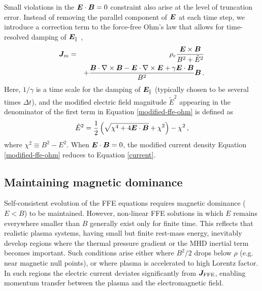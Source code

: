Small violations in the $\boldsymbol{E} \cdot\boldsymbol{B} = 0$ constraint also arise at the level of truncation error. Instead of removing the parallel component of $\boldsymbol{E}$ at each time step, we introduce a correction term to the force-free Ohm's law that allows for time-resolved damping of $\boldsymbol{E}_\parallel$ \citep{2017MNRAS.469.3656P},
%
\begin{eqnarray} \label{modified-ffe-ohm}
		\boldsymbol{J}_m &=& \rho_e \frac{\boldsymbol{E}\times\boldsymbol{B}}{B^2 +\tilde{E}^2} \nonumber\\
		 && + \frac{\boldsymbol{B}\cdot\nabla\times \boldsymbol{B} - \boldsymbol{E}\cdot\nabla\times\boldsymbol{E} + \gamma \boldsymbol{E}\cdot\boldsymbol{B}}{B^2}\boldsymbol{B} \, .
\end{eqnarray}
%
Here, $1 / \gamma$ is a time scale for the damping of $\boldsymbol{E}_\parallel$ (typically chosen to be several times $\Delta t$), and the modified electric field magnitude $\tilde E^2$ appearing in the denominator of the first term in Equation \ref{modified-ffe-ohm} is defined as \citep{2012ApJ...746...60L}
%
\begin{equation}
	\tilde{E}^2 = \frac{1}{2} \left(\sqrt{\chi^4 + 4 \boldsymbol{E} \cdot \boldsymbol{B}} + \chi^2\right) - \chi^2 \, ,
\end{equation}
%
where $\chi^2 \equiv B^2 - E^2$.
When $\boldsymbol{E} \cdot \boldsymbol{B} = 0$, the modified current density Equation \ref{modified-ffe-ohm} reduces to Equation \ref{current}.


\subsection{Maintaining magnetic dominance}
\label{magnetic-dominance}
%
Self-consistent evolution of the FFE equations requires magnetic dominance ($E < B$) to be maintained. However, non-linear FFE solutions in which $E$ remains everywhere smaller than $B$ generally exist only for finite time. This reflects that realistic plasma systems, having small but finite rest-mass energy, inevitably develop regions where the thermal pressure gradient or the MHD inertial term becomes important.
Such conditions arise either where $B^2 / 2$ drops below $\rho$ (e.g. near magnetic null points), or where plasma is accelerated to high Lorentz factor. In such regions the electric current deviates significantly from $\boldsymbol{J}_{\rm FFE}$, enabling momentum transfer between the plasma and the electromagnetic field. 

